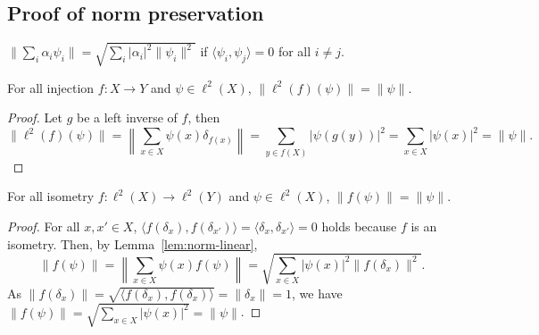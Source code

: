 \subsection{Proof of norm preservation}
\begin{lem} \label{lem:norm-linear}
  $\|\sum_i \alpha_i \psi_i\| = \sqrt{\sum_i |\alpha_i|^2 \|\psi_i\|^2}$ if $\langle \psi_i, \psi_j\rangle = 0$ for all $i\ne j$.
\end{lem}

\begin{lem} \label{lem:functor-norm}
  For all injection $f:X\to Y$ and $\psi\in \ell^2(X)$, $\|\ell^2(f)(\psi)\| = \|\psi\|$.
\end{lem}
\begin{proof}
  Let $g$ be a left inverse of $f$, then
  \begin{equation}
    \|\ell^2(f)(\psi)\| = \left\|\sum_{x\in X} \psi(x) \delta_{f(x)}\right\| = \sum_{y\in f(X)} |\psi(g(y))|^2 = \sum_{x\in X} |\psi(x)|^2 = \|\psi\|.
  \end{equation}
\end{proof}

\begin{lem} \label{lem:isometry-norm}
  For all isometry $f:\ell^2(X)\to\ell^2(Y)$ and $\psi\in \ell^2(X)$, $\|f(\psi)\| = \|\psi\|$.
\end{lem}
\begin{proof}
  For all $x, x'\in X$, $\langle f(\delta_x), f(\delta_{x'})\rangle = \langle \delta_x, \delta_{x'}\rangle = 0$ holds because $f$ is an isometry.
  Then, by Lemma~\ref{lem:norm-linear},
  \begin{equation*}
    \|f(\psi)\| = \left\|\sum_{x\in X} \psi(x)f(\psi)\right\| = \sqrt{\sum_{x\in X} |\psi(x)|^2\|f(\delta_x)\|^2}.
  \end{equation*}
  As $\|f(\delta_x)\| = \sqrt{\langle f(\delta_x), f(\delta_x)\rangle} = \|\delta_x\| = 1$, we have $\|f(\psi)\| = \sqrt{\sum_{x\in X} |\psi(x)|^2} = \|\psi\|$.
\end{proof}


